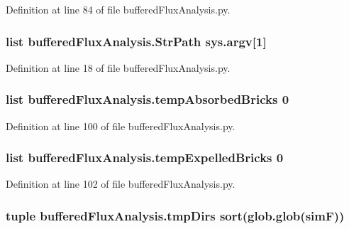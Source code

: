 Definition at line 84 of file buffered\-Flux\-Analysis.\-py.

\hypertarget{namespacebuffered_flux_analysis_a86b649a1e51f1e3384ad432c0de3340b}{
\subsubsection[{Str\-Path}]{\setlength{\rightskip}{0pt plus 5cm}list buffered\-Flux\-Analysis.\-Str\-Path sys.\-argv\mbox{[}1\mbox{]}}}\label{namespacebuffered_flux_analysis_a86b649a1e51f1e3384ad432c0de3340b}


Definition at line 18 of file buffered\-Flux\-Analysis.\-py.

\hypertarget{namespacebuffered_flux_analysis_a83acfbebbbafd68ab6574c76d2be6c60}{
\subsubsection[{temp\-Absorbed\-Bricks}]{\setlength{\rightskip}{0pt plus 5cm}list buffered\-Flux\-Analysis.\-temp\-Absorbed\-Bricks 0}}\label{namespacebuffered_flux_analysis_a83acfbebbbafd68ab6574c76d2be6c60}


Definition at line 100 of file buffered\-Flux\-Analysis.\-py.

\hypertarget{namespacebuffered_flux_analysis_a496cf2986cc324a0421c288991e1be93}{
\subsubsection[{temp\-Expelled\-Bricks}]{\setlength{\rightskip}{0pt plus 5cm}list buffered\-Flux\-Analysis.\-temp\-Expelled\-Bricks 0}}\label{namespacebuffered_flux_analysis_a496cf2986cc324a0421c288991e1be93}


Definition at line 102 of file buffered\-Flux\-Analysis.\-py.

\hypertarget{namespacebuffered_flux_analysis_afaa1b171179d99fee6ead2ae14dc8fc6}{
\subsubsection[{tmp\-Dirs}]{\setlength{\rightskip}{0pt plus 5cm}tuple buffered\-Flux\-Analysis.\-tmp\-Dirs sort(glob.\-glob({\bf sim\-F}))}}\label{namespacebuffered_flux_analysis_afaa1b171179d99fee6ead2ae14dc8fc6}


